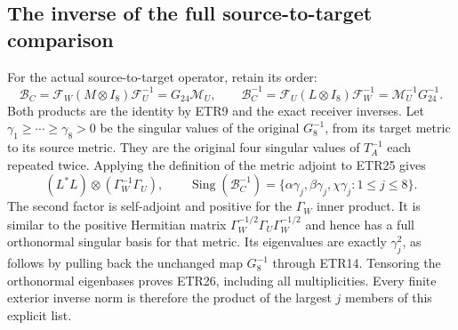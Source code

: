 \subsection{The inverse of the full source-to-target comparison}
For the actual source-to-target operator, retain its order:
\[
 \mathcal B_C=\mathcal F_W(M\otimes I_8)\mathcal F_U^{-1}
              =G_{24}\mathcal M_U,\qquad
 \mathcal B_C^{-1}=\mathcal F_U(L\otimes I_8)\mathcal F_W^{-1}
              =\mathcal M_U^{-1}G_{24}^{-1}.             \tag{ETR25}
\]
Both products are the identity by ETR9 and the exact receiver inverses.
Let $\gamma_1\ge\cdots\ge\gamma_8>0$ be the singular values of the
original $G_8^{-1}$, from its target metric to its source metric. They
are the original four singular values of $T_A^{-1}$ each repeated
twice. Applying the definition of the metric adjoint to ETR25 gives
\[
 (L^*L)\otimes(\Gamma_W^{-1}\Gamma_U),\qquad
 \operatorname{Sing}(\mathcal B_C^{-1})
     =\{\alpha\gamma_j,\beta\gamma_j,\chi\gamma_j:1\le j\le8\}.
                                                               \tag{ETR26}
\]
The second factor is self-adjoint and positive for the $\Gamma_W$
inner product. It is similar to the positive Hermitian matrix
$\Gamma_W^{-1/2}\Gamma_U\Gamma_W^{-1/2}$ and hence has a full
orthonormal singular basis for that metric. Its eigenvalues are exactly
$\gamma_j^2$, as follows by pulling back the unchanged map $G_8^{-1}$
through ETR14. Tensoring the orthonormal eigenbases proves ETR26,
including all multiplicities. Every finite exterior inverse norm is
therefore the product of the largest $j$ members of this explicit list.

